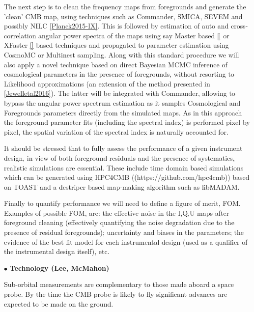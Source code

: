 The next step is to clean the frequency maps from foregrounds and generate the 'clean' CMB map, using techniques such as Commander, SMICA, SEVEM and possibly NILC \ref{Planck2015-IX}. This is followed by estimation of auto and cross-correlation angular power spectra of the maps using say Master based \ref{}  or XFaster \ref{} based techniques and propagated to parameter estimation using CosmoMC or Multinest sampling.
Along with this standard procedure we will also apply a novel technique based on direct Bayesian MCMC inference of cosmological parameters in the presence of foregrounds, without resorting to Likelihood approximations (an extension of the method presented in  \ref{Jewelletal2016}). 
The latter will be integrated with Commander, allowing to bypass the angular power spectrum estimation as it samples Cosmological and Foregrounds parameters directly from the simulated maps. As in this approach the foreground parameter fits (including the spectral index) is performed pixel by pixel, the spatial variation of the spectral index is naturally accounted for. 


It should be stressed that to fully assess the performance of a given instrument design, in view of both foreground residuals and the presence of systematics, realistic simulations are essential. These include time domain based simulations which can be generated using HPC4CMB ((https://github.com/hpc4cmb)) based on TOAST 
and a destriper based map-making algorithm such as libMADAM. 


Finally to quantify performance we will need to define a figure of merit, FOM. Examples of possible FOM, are: the effective noise in the I,Q,U maps after foreground cleaning (effectively quantifying the noise degradation due to the presence of residual foregrounds); uncertainty and biases in the parameters; the evidence of the best fit model for each instrumental design (used as a qualifier of the instrumental design itself), etc.


 




$\bullet$ {\bf Technology (Lee, McMahon)} \hspace{0.1in}


Sub-orbital measurements are complementary to those made aboard a space probe. By the time the \ac{CMB} probe is likely to fly significant advances are expected to be made on the ground. 

